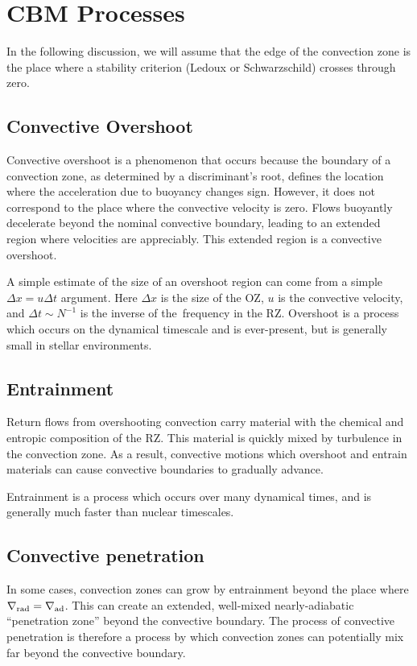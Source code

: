 \section{CBM Processes}
\label{sec:processes}

In the following discussion, we will assume that the edge of the convection zone is the place where a stability criterion (Ledoux or Schwarzschild) crosses through zero.

\subsection{Convective Overshoot}
Convective overshoot is a phenomenon that occurs because the boundary of a convection zone, as determined by a discriminant's root, defines the location where the acceleration due to buoyancy changes sign.
However, it does not correspond to the place where the convective velocity is zero.
Flows buoyantly decelerate beyond the nominal convective boundary, leading to an extended region where velocities are appreciably.
This extended region is a convective overshoot.

A simple estimate of the size of an overshoot region can come from a simple $\Delta x = u \Delta t$ argument.
Here $\Delta x$ is the size of the OZ, $u$ is the convective velocity, and $\Delta t \sim N^{-1}$ is the inverse of the \brunt$\,$frequency in the RZ.
Overshoot is a process which occurs on the dynamical timescale and is ever-present, but is generally small in stellar environments.


\subsection{Entrainment}
Return flows from overshooting convection carry material with the chemical and entropic composition of the RZ.
This material is quickly mixed by turbulence in the convection zone.
As a result, convective motions which overshoot and entrain materials can cause convective boundaries to gradually advance.

Entrainment is a process which occurs over many dynamical times, and is generally much faster than nuclear timescales.


\subsection{Convective penetration}
In some cases, convection zones can grow by entrainment beyond the place where $\nabla_{\rm{rad}} = \nabla_{\rm{ad}}$.
This can create an extended, well-mixed nearly-adiabatic ``penetration zone'' beyond the convective boundary.
The process of convective penetration is therefore a process by which convection zones can potentially mix far beyond the convective boundary.


